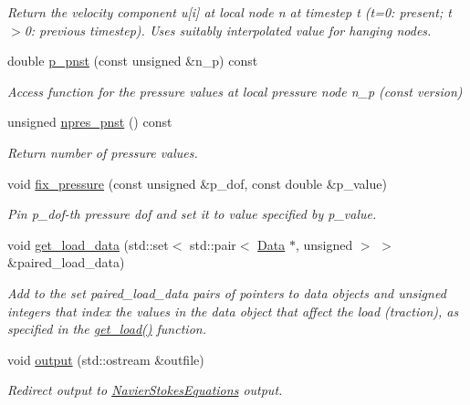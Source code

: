 \begin{DoxyCompactItemize}
\begin{DoxyCompactList}\small\item\em Return the velocity component u\mbox{[}i\mbox{]} at local node n at timestep t (t=0\+: present; t$>$0\+: previous timestep). Uses suitably interpolated value for hanging nodes. \end{DoxyCompactList}\item 
double \hyperlink{classoomph_1_1PolarTaylorHoodElement_a0ddfef8a7a5ab18b920a498be2d92cba}{p\+\_\+pnst} (const unsigned \&n\+\_\+p) const
\begin{DoxyCompactList}\small\item\em Access function for the pressure values at local pressure node n\+\_\+p (const version) \end{DoxyCompactList}\item 
unsigned \hyperlink{classoomph_1_1PolarTaylorHoodElement_a4ffb1ba7522ccb0d2fb181faa5bdf79b}{npres\+\_\+pnst} () const
\begin{DoxyCompactList}\small\item\em Return number of pressure values. \end{DoxyCompactList}\item 
void \hyperlink{classoomph_1_1PolarTaylorHoodElement_aea2da4c0a1114dacbf15d463da2f3d4f}{fix\+\_\+pressure} (const unsigned \&p\+\_\+dof, const double \&p\+\_\+value)
\begin{DoxyCompactList}\small\item\em Pin p\+\_\+dof-\/th pressure dof and set it to value specified by p\+\_\+value. \end{DoxyCompactList}\item 
void \hyperlink{classoomph_1_1PolarTaylorHoodElement_a0a432b5a93ca2e789992ec77d050f49a}{get\+\_\+load\+\_\+data} (std\+::set$<$ std\+::pair$<$ \hyperlink{classoomph_1_1Data}{Data} $\ast$, unsigned $>$ $>$ \&paired\+\_\+load\+\_\+data)
\begin{DoxyCompactList}\small\item\em Add to the set paired\+\_\+load\+\_\+data pairs of pointers to data objects and unsigned integers that index the values in the data object that affect the load (traction), as specified in the \hyperlink{classoomph_1_1PolarNavierStokesEquations_a47ae24dc603a7d46bd4a85ccfb2b8e23}{get\+\_\+load()} function. \end{DoxyCompactList}\item 
void \hyperlink{classoomph_1_1PolarTaylorHoodElement_ad6c70423cee82f9f2c7ff698f4f910ef}{output} (std\+::ostream \&outfile)
\begin{DoxyCompactList}\small\item\em Redirect output to \hyperlink{classoomph_1_1NavierStokesEquations}{Navier\+Stokes\+Equations} output. \end{DoxyCompactList}\item 

\end{DoxyCompactItemize}
